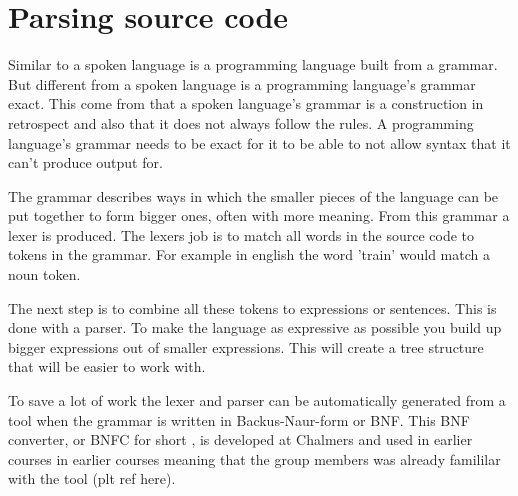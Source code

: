 \section{Parsing source code} \label{sec:bnfc}


Similar to a spoken language is a programming language built from a grammar. But different from a spoken language is a programming language's grammar exact. This come from that a spoken language's grammar is a construction in retrospect and also that it does not always follow the rules. 
A programming language's grammar needs to be exact for it to be able to not allow syntax that it can't produce output for. 

The grammar describes ways in which the smaller pieces of the language can be put together to form bigger ones, often with more meaning. From this grammar a lexer is produced. The lexers job is to match all words in the source code to tokens in the grammar. For example in english the word 'train' would match a noun token. 

The next step is to combine all these tokens to expressions or sentences. This is done with a parser. To make the language as expressive as possible you build up bigger expressions out of smaller expressions. This will create a tree structure that will be easier to work with. 

To save a lot of work the lexer and parser can be automatically generated from a tool when the grammar is written in Backus-Naur-form or BNF. This BNF converter, or BNFC for short , is developed at Chalmers and used in earlier courses in earlier courses meaning that the group members was already famililar with the tool (plt ref here).


